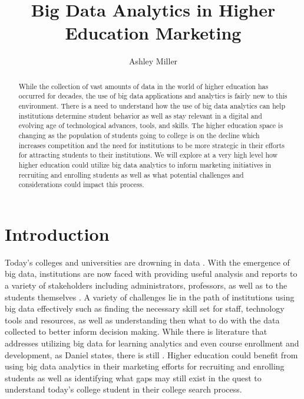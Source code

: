 \documentclass[sigconf]{acmart}
\begin{document}
\title{Big Data Analytics in Higher Education Marketing}


\author{Ashley Miller}



\renewcommand{\shortauthors}{B. Trovato et al.}


\begin{abstract}
While the collection of vast amounts of data in the world of higher education has occurred for decades, the use of big data applications and analytics is fairly new to this environment. There is a need to understand how the use of big data analytics can help institutions determine student behavior as well as stay relevant in a digital and evolving age of technological advances, tools, and skills. The higher education space is changing as the population of students going to college is on the decline which increases competition and the need for institutions to be more strategic in their efforts for attracting students to their institutions. We will explore at a very high level how higher education could utilize big data analytics to inform marketing initiatives in recruiting and enrolling students as well as what potential challenges and considerations could impact this process. 
\end{abstract}



\maketitle

\section{Introduction}

Today's colleges and universities are drowning in data \cite{Daniel2015}. With the emergence of big data, institutions are now faced with providing useful analysis and reports to a variety of stakeholders including administrators, professors, as well as to the students themselves \cite{Daniel2015}. A variety of challenges lie in the path of institutions using big data effectively such as finding the necessary skill set for staff, technology tools and resources, as well as understanding then what to do with the data collected to better inform decision making. 
While there is literature that addresses utilizing big data for learning analytics and even course enrollment and development, as Daniel states, there is still  \cite{Daniel2015}. Higher education could benefit from using big data analytics in their marketing efforts for recruiting and enrolling students as well as identifying what gaps may still exist in the quest to understand today's college student in their college search process. 
\end{document}
